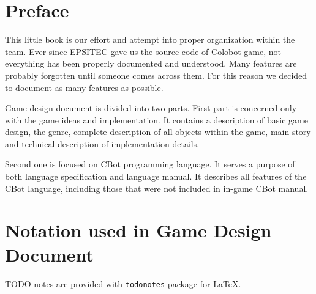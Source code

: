 
\chapter*{Preface}

This little book is our effort and attempt into proper organization within the team. Ever since EPSITEC gave us the source code of Colobot game, not everything has been properly documented and understood. Many features are probably forgotten until someone comes across them. For this reason we decided to document as many features as possible.

Game design document is divided into two parts. First part is concerned only with the game ideas and implementation. It contains a description of basic game design, the genre, complete description of all objects within the game, main story and technical description of implementation details.

Second one is focused on CBot programming language. It serves a purpose of both language specification and language manual. It describes all features of the CBot language, including those that were not included in in-game CBot manual.



\chapter*{Notation used in Game Design Document}

TODO notes are provided with \texttt{todonotes} package for \LaTeX.



